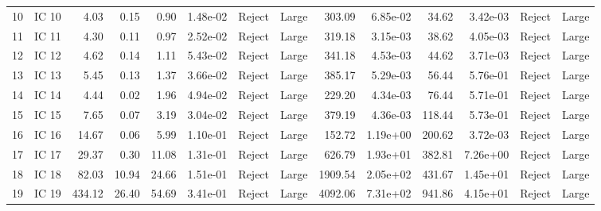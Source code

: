 \begin{tabular}{llrrrrllrrrrll}
10 &  IC 10 &               4.03 &   0.15 &                0.90 &  1.48e-02 &   Reject &       Large &                   303.09 &  6.85e-02 &                     34.62 &  3.42e-03 &  Reject &       Large \\
11 &  IC 11 &               4.30 &   0.11 &                0.97 &  2.52e-02 &   Reject &       Large &                   319.18 &  3.15e-03 &                     38.62 &  4.05e-03 &  Reject &       Large \\
12 &  IC 12 &               4.62 &   0.14 &                1.11 &  5.43e-02 &   Reject &       Large &                   341.18 &  4.53e-03 &                     44.62 &  3.71e-03 &  Reject &       Large \\
13 &  IC 13 &               5.45 &   0.13 &                1.37 &  3.66e-02 &   Reject &       Large &                   385.17 &  5.29e-03 &                     56.44 &  5.76e-01 &  Reject &       Large \\
14 &  IC 14 &               4.44 &   0.02 &                1.96 &  4.94e-02 &   Reject &       Large &                   229.20 &  4.34e-03 &                     76.44 &  5.71e-01 &  Reject &       Large \\
15 &  IC 15 &               7.65 &   0.07 &                3.19 &  3.04e-02 &   Reject &       Large &                   379.19 &  4.36e-03 &                    118.44 &  5.73e-01 &  Reject &       Large \\
16 &  IC 16 &              14.67 &   0.06 &                5.99 &  1.10e-01 &   Reject &       Large &                   152.72 &  1.19e+00 &                    200.62 &  3.72e-03 &  Reject &       Large \\
17 &  IC 17 &              29.37 &   0.30 &               11.08 &  1.31e-01 &   Reject &       Large &                   626.79 &  1.93e+01 &                    382.81 &  7.26e+00 &  Reject &       Large \\
18 &  IC 18 &              82.03 &  10.94 &               24.66 &  1.51e-01 &   Reject &       Large &                  1909.54 &  2.05e+02 &                    431.67 &  1.45e+01 &  Reject &       Large \\
19 &  IC 19 &             434.12 &  26.40 &               54.69 &  3.41e-01 &   Reject &       Large &                  4092.06 &  7.31e+02 &                    941.86 &  4.15e+01 &  Reject &       Large \\
\bottomrule
\end{tabular}
